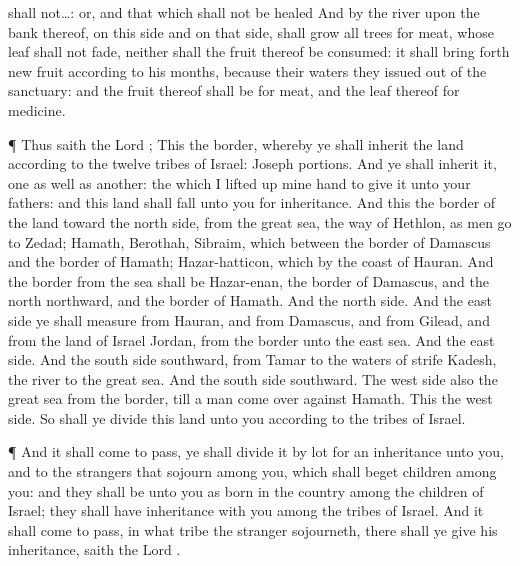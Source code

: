 {{shall not…: or, and that which shall not be healed}
And by the
river upon the
bank thereof, on this side and on that side, shall
grow all
trees for
meat, whose
leaf shall not
fade, neither shall the
fruit thereof be
consumed: it shall bring forth new
fruit according to his
months, because their
waters they issued
out of the
sanctuary: and the
fruit thereof shall be for
meat, and the
leaf thereof for
medicine.
\par }{\PP {}¶ Thus
saith the
Lord
{};
This
{} the
border, whereby ye shall
inherit the
land according to the
twelve
tribes of
Israel:
Joseph
{}
portions.
And ye shall
inherit it,
one as well as
another:
{} the which I lifted
up mine
hand to
give it unto your
fathers: and this
land shall
fall unto you for
inheritance.
And this
{} the
border of the
land toward the
north
side, from the
great
sea, the
way of
Hethlon, as men
go to
Zedad;
Hamath,
Berothah,
Sibraim, which
{} between the
border of
Damascus and the
border of
Hamath;
Hazar-hatticon, which
{} by the
coast of
Hauran.
And the
border from the
sea shall be
Hazar-enan, the
border of
Damascus, and the
north
northward, and the
border of
Hamath. And
{} the
north
side.
And the
east
side ye shall
measure
from
Hauran, and
from
Damascus, and
from
Gilead, and
from the
land of
Israel
{}
Jordan, from the
border unto the
east
sea. And
{} the
east
side.
And the
south
side
southward, from
Tamar
{} to the
waters of
strife
{}
Kadesh, the
river to the
great
sea. And
{} the
south
side
southward.
The
west
side also
{} the
great
sea from the
border, till a man
come over
against
Hamath. This
{} the
west
side.
So shall ye
divide this
land unto you according to the
tribes of
Israel.
\par }{\PP {}¶ And it shall come to pass,
{} ye shall
divide it by lot for an
inheritance unto you, and to the
strangers that
sojourn
among you, which shall
beget
children
among you: and they shall be unto you as
born in the
country among the
children of
Israel; they shall
have
inheritance with you
among the
tribes of
Israel.
And it shall come to pass,
{} in what
tribe the
stranger
sojourneth, there shall ye
give
{} his
inheritance,
saith the
Lord
{}.

}
